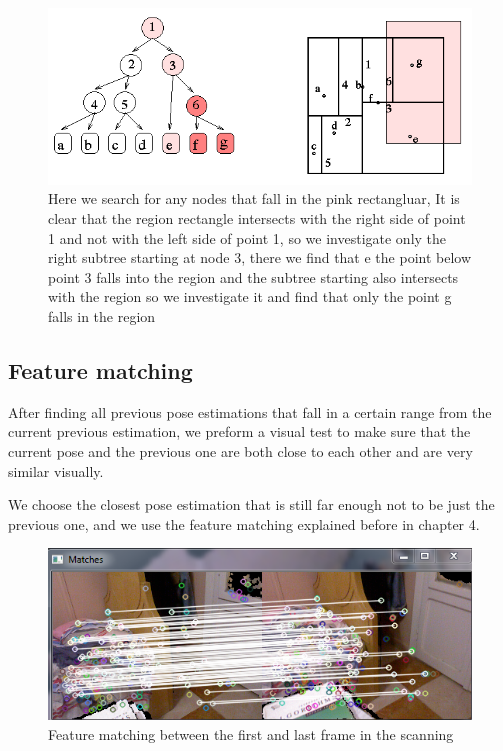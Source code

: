 \begin{figure}[H]
\centering
\includegraphics{Loop/k-d_tree_search2.png}
\caption{Here we search for any nodes that fall in the pink rectangluar, It is clear that the region rectangle intersects with the right side of point 1 and not with the left side of point 1, so we investigate only the right subtree starting at node 3, there we find that e the point below point 3 falls into the region and the subtree starting also intersects with the region so we investigate it and find that only the point g falls in the region}
\label{fig:k-d_tree_search2}
\end{figure}


\subsection{Feature matching}

After finding all previous pose estimations that fall in a certain range from the current previous estimation, we preform a visual test to make sure that the current pose and the previous one are both close to each other and are very similar visually.

We choose the closest pose estimation that is still far enough not to be just the previous one, and we use the feature matching explained before in chapter 4.

\begin{figure}[H]
\centering
\includegraphics{Loop/loop_matches.png}
\caption{Feature matching between the first and last frame in the scanning }
\label{fig:first_frame_loop}
\end{figure}


